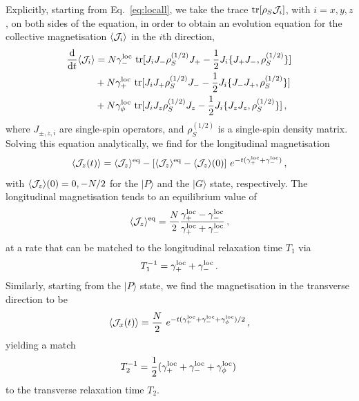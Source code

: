 \documentclass[aps,prd,10pt,twocolumn,superscriptaddress,floatfix,nofootinbib,amsmath,amssymb,altaffilletter,preprintnumbers]{revtex4-1}
\begin{document}
Explicitly, starting from Eq.~\eqref{eq:locall}, we take the trace ${\rm tr}[\rho_S {\cal J}_i]$, with $i=x,y,z$, on both sides of the equation, in order to obtain an evolution equation for the collective magnetisation $\langle {\cal J}_i\rangle$ in the $i$th direction,
\begin{equation}
\begin{aligned}
\frac{\mathrm{d} }{\mathrm{d}t}\langle {\cal J}_i \rangle & =  
N \gamma^{\rm loc}_- ~\text{tr}[J_iJ_- \rho_S^{(1/2)} J_+ - \frac{1}{2} J_i\{J_+ J_-,\rho_S^{(1/2)}\} ] \\
& + N \gamma^{\rm loc}_+~\text{tr}[J_iJ_+ \rho_S^{(1/2)} J_- - \frac{1}{2} J_i\{J_- J_+,\rho_S^{(1/2)}\} ] \\
& + N\gamma_{\phi}^{\rm loc}~\text{tr}[J_iJ_z \rho_S^{(1/2)} J_z - \frac{1}{2} J_i\{J_z J_z,\rho_S^{(1/2)}\} ]\, ,
\end{aligned}
\end{equation}
where $J_{\pm, z,i}$ are single-spin operators, and $\rho_S^{(1/2)}$  is a single-spin density matrix.
Solving this equation analytically, we find for the longitudinal magnetisation 
\begin{equation}
    \langle {\cal J}_z (t)\rangle  =\langle {\cal J}_z \rangle^{\rm eq}-[\langle {\cal J}_z \rangle^{\rm eq}-\langle {\cal J}_z \rangle (0)]~e^{-t(\gamma^{\rm loc}_++\gamma^{\rm loc}_-)}\, ,
    \label{eq:fidmz}
\end{equation}    
with $\langle {\cal J}_z \rangle(0)=0,-N/2$ for the $\vert P\rangle$ and the $\vert G\rangle$ state, respectively.  The longitudinal magnetisation tends to an equilibrium value of
\begin{equation}
    \langle {\cal J}_z \rangle^{\rm eq} =\frac{N}{2}\frac{\gamma^{\rm loc}_{+}-\gamma^{\rm loc}_{-}}{\gamma^{\rm loc}_{+}+\gamma^{\rm loc}_{-}}\,,
    \label{eq:mzeq}
\end{equation}
at a rate that can be matched to the longitudinal relaxation time $T_1$ via
 \begin{equation}
    T_1^{-1} = \gamma^{\rm loc}_++\gamma^{\rm loc}_-\,.
    \label{eq:t1a}
\end{equation}
Similarly, starting from the $\vert P\rangle$ state, we find the magnetisation in the transverse direction  to be
\begin{equation}
    \langle {\cal J}_x (t) \rangle=\frac{N}{2}~e^{-t(\gamma^{\rm loc}_++\gamma^{\rm loc}_-+\gamma^{\rm loc}_{\phi})/2}\, ,
\end{equation} 
yielding a match 
 \begin{equation}
    T_2^{-1} = \frac{1}{2}(\gamma^{\rm loc}_++\gamma^{\rm loc}_-+\gamma^{\rm loc}_{\phi})\, 
    \label{eq:t2a}
\end{equation}
to the transverse relaxation time $T_2$. 
 
\end{document}
